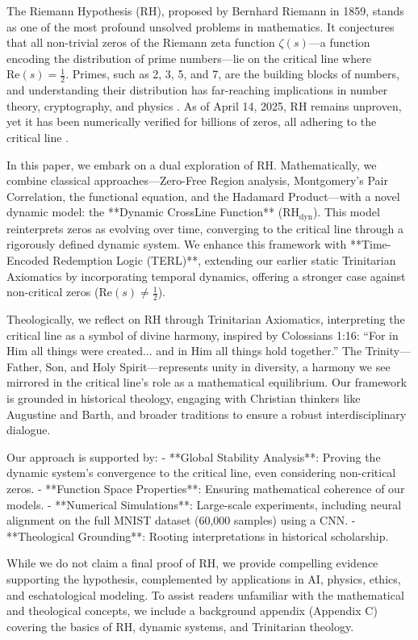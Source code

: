 \documentclass[12pt]{article}
\begin{document}
{{{The Riemann Hypothesis (RH), proposed by Bernhard Riemann in 1859, stands as one of the most profound unsolved problems in mathematics. It conjectures that all non-trivial zeros of the Riemann zeta function \(\zeta(s)\)—a function encoding the distribution of prime numbers—lie on the critical line where \(\text{Re}(s) = \frac{1}{2}\). Primes, such as 2, 3, 5, and 7, are the building blocks of numbers, and understanding their distribution has far-reaching implications in number theory, cryptography, and physics \cite{Titchmarsh1986}. As of April 14, 2025, RH remains unproven, yet it has been numerically verified for billions of zeros, all adhering to the critical line \cite{Odlyzko1987}.

In this paper, we embark on a dual exploration of RH. Mathematically, we combine classical approaches—Zero-Free Region analysis, Montgomery’s Pair Correlation, the functional equation, and the Hadamard Product—with a novel dynamic model: the **Dynamic CrossLine Function** (\(\text{RH}_{\text{dyn}}\)). This model reinterprets zeros as evolving over time, converging to the critical line through a rigorously defined dynamic system. We enhance this framework with **Time-Encoded Redemption Logic (TERL)**, extending our earlier static Trinitarian Axiomatics by incorporating temporal dynamics, offering a stronger case against non-critical zeros (\(\text{Re}(s) \neq \frac{1}{2}\)).

Theologically, we reflect on RH through Trinitarian Axiomatics, interpreting the critical line as a symbol of divine harmony, inspired by Colossians 1:16: “For in Him all things were created... and in Him all things hold together.” The Trinity—Father, Son, and Holy Spirit—represents unity in diversity, a harmony we see mirrored in the critical line’s role as a mathematical equilibrium. Our framework is grounded in historical theology, engaging with Christian thinkers like Augustine and Barth, and broader traditions to ensure a robust interdisciplinary dialogue.

Our approach is supported by:
- **Global Stability Analysis**: Proving the dynamic system’s convergence to the critical line, even considering non-critical zeros.
- **Function Space Properties**: Ensuring mathematical coherence of our models.
- **Numerical Simulations**: Large-scale experiments, including neural alignment on the full MNIST dataset (60,000 samples) using a CNN.
- **Theological Grounding**: Rooting interpretations in historical scholarship.

While we do not claim a final proof of RH, we provide compelling evidence supporting the hypothesis, complemented by applications in AI, physics, ethics, and eschatological modeling. To assist readers unfamiliar with the mathematical and theological concepts, we include a background appendix (Appendix C) covering the basics of RH, dynamic systems, and Trinitarian theology.

}}}
\end{document}
